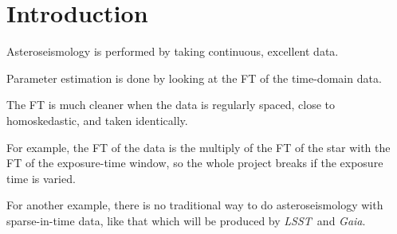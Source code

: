 \documentclass[modern]{aastex61}
\newcommand{\acronym}[1]{{\small{#1}}}
\newcommand{\project}[1]{\textsl{#1}}
\newcommand{\gaia}{\project{Gaia}}
\newcommand{\lsst}{\project{\acronym{LSST}}}
\begin{document}



\section{Introduction}\label{sec:intro}

Asteroseismology is performed by taking continuous, excellent data.

Parameter estimation is done by looking at the FT of the time-domain data.

The FT is much cleaner when the data is regularly spaced, close to
homoskedastic, and taken identically.

For example, the FT of the data is the multiply of the FT of the star
with the FT of the exposure-time window, so the whole project breaks
if the exposure time is varied.

For another example, there is no traditional way to do
asteroseismology with sparse-in-time data, like that which will be
produced by \lsst\ and \gaia.
\end{document}
